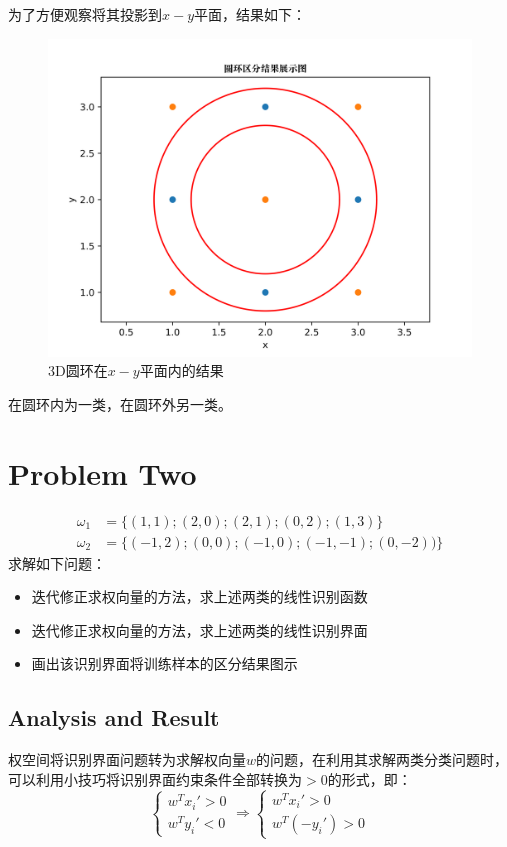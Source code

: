 \documentclass{article}
\newcommand{\hs}{\hspace{2em}}
\begin{document}
为了方便观察将其投影到$x-y$平面，结果如下：
\begin{figure}[htbp]
	\centering
	\includegraphics[width=0.5\linewidth]{img//fig5.png}
	\caption{3D圆环在$x-y$平面内的结果}
\end{figure}

在圆环内为一类，在圆环外另一类。  

\section{Problem Two}
{}

\begin{equation*}
\begin{split}
\omega_1 &= \{(1,1); (2,0); (2,1); (0,2); (1,3) \}\\
\omega_2 &= \{(-1,2); (0,0); (-1,0); (-1,-1); (0,-2))\}
\end{split}
\end{equation*}
求解如下问题：
\begin{itemize}	
	\item 迭代修正求权向量的方法，求上述两类的线性识别函数
	\item 迭代修正求权向量的方法，求上述两类的线性识别界面
	\item 画出该识别界面将训练样本的区分结果图示 
\end{itemize}


\subsection*{Analysis and Result}

{}

\hs 权空间将识别界面问题转为求解权向量$w$的问题，在利用其求解两类分类问题时，可以利用小技巧将识别界面约束条件全部转换为$>0$的形式，即：
\begin{equation*}
 \left\lbrace \begin{array}{c}
 w^Tx_i '>0 \\
 w^Ty_i '<0
 \end{array} \right.  \Longrightarrow 
  \left\lbrace \begin{array}{c}
 w^Tx_i '>0 \\
 w^T(-y_i ')>0
 \end{array} \right.
\end{equation*}
\end{document}
